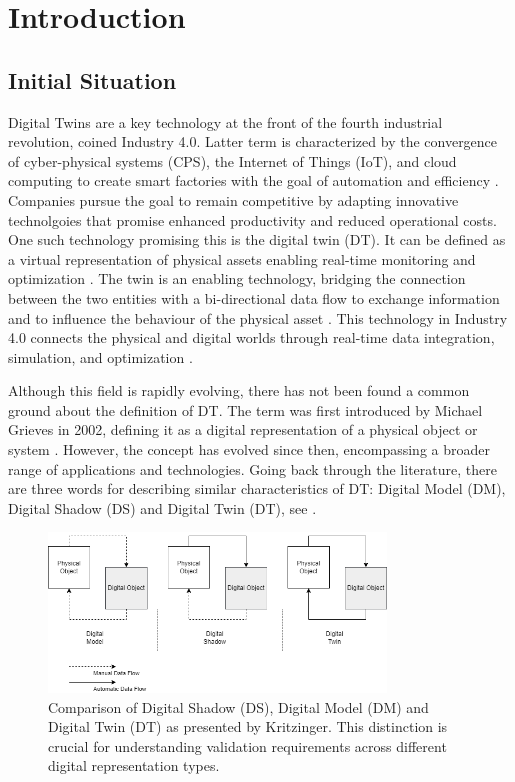 \chapter{Introduction}
\label{chap:introduction}

\section{Initial Situation}
Digital Twins are a key technology at the front of the fourth industrial revolution, coined Industry 4.0.
Latter term is characterized by the convergence of cyber-physical systems (CPS), the Internet of Things (IoT), and cloud computing to create smart factories with the goal of automation and efficiency \parencite{Oztemel2020}. Companies pursue the goal to remain competitive by adapting innovative technolgoies that promise enhanced productivity and reduced operational costs. One such technology promising this is the digital twin (DT). It can be defined as a virtual representation of physical assets enabling real-time monitoring and optimization \parencite{Tao2018ijamt}. The twin is an enabling technology, bridging the connection between the two entities with a bi-directional data flow to exchange information and to influence the behaviour of the physical asset \parencite{grieves2014digital}. This technology in Industry 4.0 connects the physical and digital worlds through real-time data integration, simulation, and optimization \parencite{judijanto2024trends}.

Although this field is rapidly evolving, there has not been found a common ground about the definition of DT. The term was first introduced by Michael Grieves in 2002, defining it as a digital representation of a physical object or system \parencite{grieves2014digital}. However, the concept has evolved since then, encompassing a broader range of applications and technologies. Going back through the literature, there are three words for describing similar characteristics of DT: Digital Model (DM), Digital Shadow (DS) and Digital Twin (DT), see  \parencite{jones2020characterising,Zhang2021jmsy}.

\begin{figure}[htbp]
  \centering
  \includegraphics[width=0.8\textwidth]{figures/kritzinger.png}
  \caption{Comparison of Digital Shadow (DS), Digital Model (DM) and Digital Twin (DT) as presented by Kritzinger. This distinction is crucial for understanding validation requirements across different digital representation types.}
  \label{fig:Kritzinger}
\end{figure}

